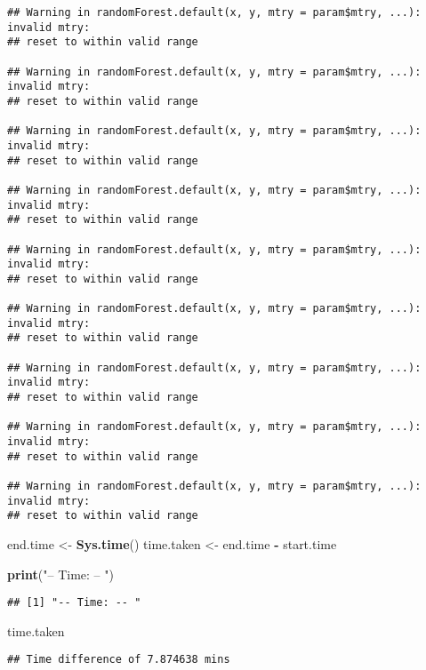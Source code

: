 \documentclass[
]{article}
\newenvironment{Shaded}{\begin{snugshade}}{\end{snugshade}}
\newcommand{\KeywordTok}[1]{\textcolor[rgb]{0.13,0.29,0.53}{\textbf{#1}}}
\newcommand{\NormalTok}[1]{#1}
\newcommand{\OperatorTok}[1]{\textcolor[rgb]{0.81,0.36,0.00}{\textbf{#1}}}
\newcommand{\StringTok}[1]{\textcolor[rgb]{0.31,0.60,0.02}{#1}}
\begin{document}
\begin{verbatim}
## Warning in randomForest.default(x, y, mtry = param$mtry, ...): invalid mtry:
## reset to within valid range

## Warning in randomForest.default(x, y, mtry = param$mtry, ...): invalid mtry:
## reset to within valid range

## Warning in randomForest.default(x, y, mtry = param$mtry, ...): invalid mtry:
## reset to within valid range

## Warning in randomForest.default(x, y, mtry = param$mtry, ...): invalid mtry:
## reset to within valid range

## Warning in randomForest.default(x, y, mtry = param$mtry, ...): invalid mtry:
## reset to within valid range

## Warning in randomForest.default(x, y, mtry = param$mtry, ...): invalid mtry:
## reset to within valid range

## Warning in randomForest.default(x, y, mtry = param$mtry, ...): invalid mtry:
## reset to within valid range

## Warning in randomForest.default(x, y, mtry = param$mtry, ...): invalid mtry:
## reset to within valid range

## Warning in randomForest.default(x, y, mtry = param$mtry, ...): invalid mtry:
## reset to within valid range
\end{verbatim}

\begin{Shaded}
\begin{Highlighting}[]
\NormalTok{end.time <-}\StringTok{ }\KeywordTok{Sys.time}\NormalTok{()}
\NormalTok{time.taken <-}\StringTok{ }\NormalTok{end.time }\OperatorTok{-}\StringTok{ }\NormalTok{start.time}

\KeywordTok{print}\NormalTok{(}\StringTok{"-- Time: -- "}\NormalTok{)}
\end{Highlighting}
\end{Shaded}

\begin{verbatim}
## [1] "-- Time: -- "
\end{verbatim}

\begin{Shaded}
\begin{Highlighting}[]
\NormalTok{time.taken}
\end{Highlighting}
\end{Shaded}

\begin{verbatim}
## Time difference of 7.874638 mins
\end{verbatim}
\end{document}
